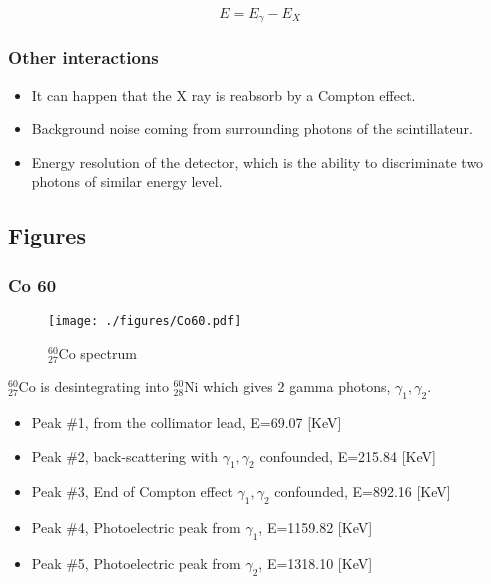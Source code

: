 \documentclass[a4paper,12pt,oneside]{article}
\begin{document}
$$E=E_{\gamma}-E_{X}$$

\subsubsection{Other interactions}
\begin{itemize}
\item It can happen that the X ray is reabsorb by a Compton effect.
\item Background noise coming from surrounding photons of the scintillateur.
\item Energy resolution of the detector, which is the ability to discriminate two photons of similar energy level.
\end{itemize}

\newpage
\subsection{Figures}
\begin{comment}
\subsubsection{Co 57}
\begin{figure}[h!]
  \begin{center}
  \texttt{[image: ./figures/Co57.pdf]}
  \caption{} \label{fig:Co57}
  \end{center}
\end{figure}


\newpage
\end{comment}
\subsubsection{Co 60}
\begin{figure}[h!]
  \begin{center}
  \texttt{[image: ./figures/Co60.pdf]}
  \caption{$_{27}^{60}$Co spectrum} \label{fig:Co60}
  \end{center}
\end{figure}

$_{27}^{60}$Co is desintegrating into $_{28}^{60}$Ni which gives 2 gamma photons, $\gamma_1,\gamma_2$.

\begin{itemize}
\item Peak \#1, from the collimator lead, E=69.07 [KeV]
\item Peak \#2, back-scattering with $\gamma_1,\gamma_2$ confounded, E=215.84 [KeV]
\item Peak \#3, End of Compton effect $\gamma_1,\gamma_2$ confounded, E=892.16 [KeV]
\item Peak \#4, Photoelectric peak from $\gamma_1$, E=1159.82 [KeV]
\item Peak \#5, Photoelectric peak from $\gamma_2$, E=1318.10 [KeV]
\end{itemize}
\end{document}
